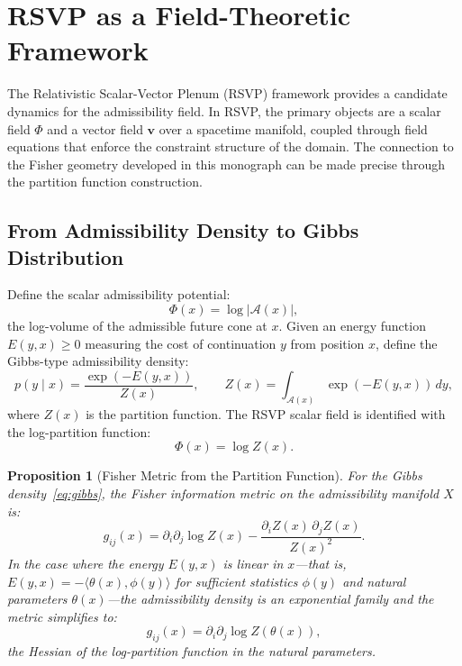 \documentclass[12pt, oneside]{book}
\theoremstyle{plain-flyxion}
\newtheorem{proposition}[theorem]{Proposition}
\theoremstyle{definition-flyxion}
\newcommand{\A}{\mathcal{A}}
\begin{document}
\section{RSVP as a Field-Theoretic Framework}

The Relativistic Scalar-Vector Plenum (RSVP) framework provides
a candidate dynamics for the admissibility field. In RSVP, the primary objects are a
scalar field $\Phi$ and a vector field $\mathbf{v}$ over a spacetime manifold, coupled
through field equations that enforce the constraint structure of the domain. The
connection to the Fisher geometry developed in this monograph can be made precise through
the partition function construction.

\subsection*{From Admissibility Density to Gibbs Distribution}

Define the scalar admissibility potential:
\begin{equation}\label{eq:phi-log}
\Phi(x) = \log |\A(x)|,
\end{equation}
the log-volume of the admissible future cone at $x$. Given an energy function
$E(y, x) \geq 0$ measuring the cost of continuation $y$ from position $x$, define the
Gibbs-type admissibility density:
\begin{equation}\label{eq:gibbs}
p(y \mid x) = \frac{\exp(-E(y, x))}{Z(x)},
\qquad
Z(x) = \int_{\A(x)} \exp(-E(y, x))\, dy,
\end{equation}
where $Z(x)$ is the partition function. The RSVP scalar field is identified with the
log-partition function:
\begin{equation}\label{eq:phi-Z}
\Phi(x) = \log Z(x).
\end{equation}

\begin{proposition}[Fisher Metric from the Partition Function]\label{prop:fisher-Z}
For the Gibbs density~\eqref{eq:gibbs}, the Fisher information metric on the admissibility
manifold $X$ is:
\begin{equation}\label{eq:fisher-Z}
g_{ij}(x) = \partial_i \partial_j \log Z(x) - \frac{\partial_i Z(x)\, \partial_j Z(x)}{Z(x)^2}.
\end{equation}
In the case where the energy $E(y, x)$ is linear in $x$---that is, $E(y,x) = -\langle
\theta(x), \phi(y)\rangle$ for sufficient statistics $\phi(y)$ and natural parameters
$\theta(x)$---the admissibility density is an exponential family and the metric simplifies to:
\begin{equation}\label{eq:fisher-exp}
g_{ij}(x) = \partial_i \partial_j \log Z(\theta(x)),
\end{equation}
the Hessian of the log-partition function in the natural parameters.
\end{proposition}
\end{document}
